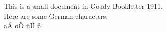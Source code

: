 \documentclass{article}
\begin{document}
This is a small document in Goudy Bookletter 1911.
\\
Here are some German characters:
\\
äÄ öÖ üÜ ß
\end{document}
